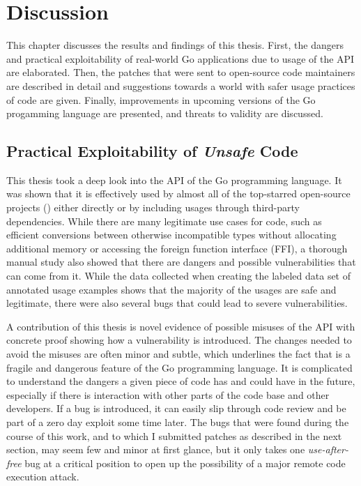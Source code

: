 
\chapter{Discussion}\label{ch:discussion}

This chapter discusses the results and findings of this thesis.
First, the dangers and practical exploitability of real-world Go applications due to usage of the \unsafe{} API are
elaborated.
Then, the patches that were sent to open-source code maintainers are described in detail and suggestions towards a
world with safer usage practices of \unsafe{} code are given.
Finally, improvements in upcoming versions of the Go progamming language are presented, and threats to validity are
discussed.



\section{Practical Exploitability of \textit{Unsafe} Code}\label{sec:discussion:exploitability}

This thesis took a deep look into the \unsafe{} API of the Go programming language.
It was shown that it is effectively used by almost all of the \projsAnalyzed{} top-starred open-source projects
(\percentageUnsafeTransitiveWithDependencies{}) either directly or by including \unsafe{} usages through third-party
dependencies.
While there are many legitimate use cases for \unsafe{} code, such as efficient conversions between otherwise
incompatible types without allocating additional memory or accessing the foreign function interface (\acrshort{FFI}),
a thorough manual study also showed that there are dangers and possible vulnerabilities that can come from it.
While the data collected when creating the labeled data set of annotated \unsafe{} usage examples shows that the
majority of the usages are safe and legitimate, there were also several bugs that could lead to severe vulnerabilities.

A contribution of this thesis is novel evidence of possible misuses of the \unsafe{} \acrshort{API} with concrete proof
showing how a vulnerability is introduced.
The changes needed to avoid the misuses are often minor and subtle, which underlines the fact that \unsafe{} is a
fragile and dangerous feature of the Go programming language.
It is complicated to understand the dangers a given piece of code has and could have in the future, especially if there
is interaction with other parts of the code base and other developers.
If a bug is introduced, it can easily slip through code review and be part of a zero day exploit some time later.
The bugs that were found during the course of this work, and to which I submitted patches as described in the next
section, may seem few and minor at first glance, but it only takes one \textit{use-after-free} bug at a critical
position to open up the possibility of a major remote code execution attack.

